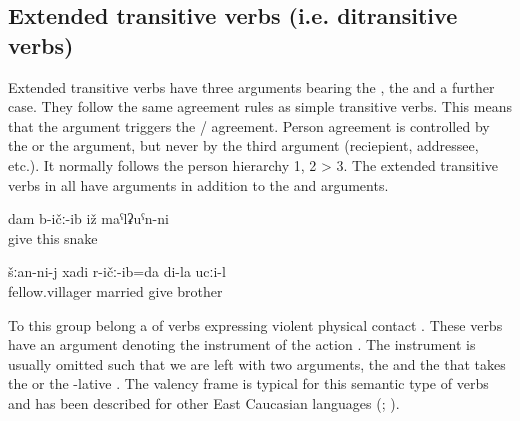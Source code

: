 
\subsection{Extended transitive verbs (i.e. ditransitive verbs)}
\label{sec:Extended transitive verbs and ditransitive verbs}

Extended transitive verbs have three arguments bearing the , the  and a further case. They follow the same agreement rules as simple transitive verbs. This means that the  argument triggers the / agreement. Person agreement is controlled by the  or the  argument, but never by the third argument (reciepient, addressee, etc.). It normally follows the person hierarchy 1, 2 > 3. The extended transitive verbs in  all have  arguments in addition to the  and  arguments.

\begin{exe}
	\ex	\label{ex:extended di-transitive verbs}
	\begin{xlist}
		\ex	{} 
		\ex	{} 
		\ex	{} 
		\ex	{} 
	\end{xlist}

	\ex	\label{ex:The snake gave it to me}
	\gll	dam	b-ičː-ib	iž	maˁlʡuˁn-ni\\
			give	this	snake\\
	\glt	{}

	\ex	\label{ex:My brother married me off to a fellow villager}
	\gll	šːan-ni-j	xadi	r-ičː-ib=da	di-la	ucːi-l\\
		fellow.villager married	give	 brother\\
	\glt	{}
\end{exe}

To this group belong a  of verbs expressing violent physical contact . These verbs have an  argument denoting the instrument of the action . The instrument is usually omitted such that we are left with two arguments, the   and the  that takes the  or the -lative . The valency frame is typical for this semantic type of verbs and has been described for other East Caucasian languages (\citealp[332]{Khalilova2009}; \citealp[476]{Forker2013a}). 

